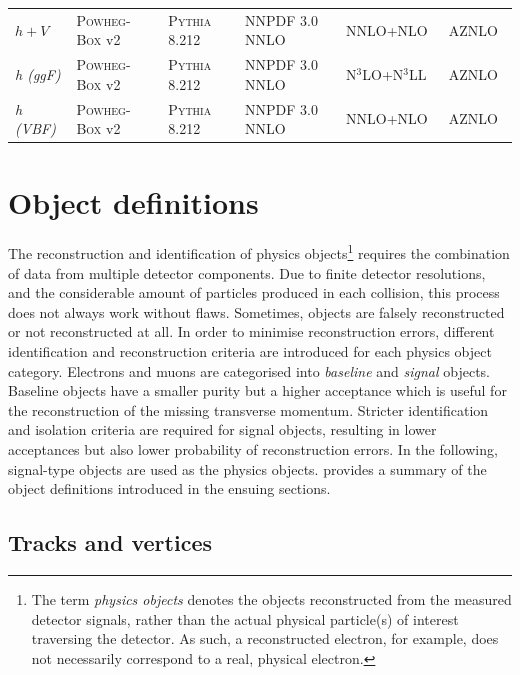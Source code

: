 \begin{table}
{\begin{tabular} {llllll}
	$h+V$ & \textsc{Powheg-Box} v2 & \textsc{Pythia} 8.212 & NNPDF 3.0 NNLO & NNLO+NLO~\cite{deFlorian:2016spz} & AZNLO~\cite{ATL-PHYS-PUB-2013-017} \\
	\textit{h (ggF)} & \textsc{Powheg-Box} v2 & \textsc{Pythia} 8.212 & NNPDF 3.0 NNLO & N$^3$LO+N$^3$LL~\cite{deFlorian:2016spz} & AZNLO \\
	\textit{h (VBF)} & \textsc{Powheg-Box} v2 & \textsc{Pythia} 8.212 & NNPDF 3.0 NNLO & NNLO+NLO~\cite{deFlorian:2016spz} & AZNLO \\
	\bottomrule
	\end{tabular}}\vspace{3mm}
	\label{tab:mc_generators}   
\end{table}

\section{Object definitions}\label{sec:object_definitions}

The reconstruction and identification of physics objects\footnote{The term \textit{physics objects} denotes the objects reconstructed from the measured detector signals, rather than the actual physical particle(s) of interest traversing the detector. As such, a reconstructed electron, for example, does not necessarily correspond to a real, physical electron.} requires the combination of data from multiple detector components.
Due to finite detector resolutions, and the considerable amount of particles produced in each collision, this process does not always work without flaws.
Sometimes, objects are falsely reconstructed or not reconstructed at all. In order to minimise reconstruction errors, different identification and reconstruction criteria are introduced for each physics object category. Electrons and muons are categorised into \textit{baseline} and \textit{signal} objects.
Baseline objects have a smaller purity but a higher acceptance which is \eg useful for the reconstruction of the missing transverse momentum. Stricter identification and isolation criteria are required for signal objects, resulting in lower acceptances but also lower probability of reconstruction errors.
In the following, signal-type objects are used as the physics objects.  provides a summary of the object definitions introduced in the ensuing sections.

\subsection{Tracks and vertices}\label{sec:reco_tracks}

